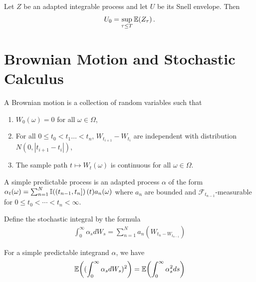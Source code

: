 \begin{thm}
  \label{sec:pric-hedg-cont-12}
  Let $Z$ be an adapted integrable process and let $U$ be its Snell
  envelope.  Then
  \begin{align}
    \label{eq:13}
    U_{0} = \sup_{\tau \leq T} \E{Z_{\tau}}.
  \end{align}
\end{thm}

\section{Brownian Motion and Stochastic Calculus}
\label{sec:brown-moti-stoch}

\begin{defn}
  \label{sec:brown-moti-stoch-1}
  A Brownian motion is a collection of random variables such that
  \begin{enumerate}
  \item $W_{0}(\omega) = 0$ for all $\omega \in \Omega$,
  \item For all $0 \leq t_{0} < t_{1} \dots < t_{n}$, $W_{t_{i+1}} -
    W_{t_{i}}$ are independent with distribution $N(0, |t_{i+1} - t_{i}|)$,
  \item The sample path $t \mapsto W_{t}(\omega)$ is continuous for
    all $\omega \in \Omega$.
  \end{enumerate}
\end{defn}

\begin{defn}
  \label{sec:brown-moti-stoch-2}
  A simple predictable process is an adapted process $\alpha$ of the
  form $\alpha_{t}(\omega) = \sum_{n=1}^{N} \I{(t_{n-1}, t_{n}]}(t)
  a_{n}(\omega)$ where $a_{n}$ are bounded and
  $\mathcal{F}_{t_{n-1}}$-measurable for $0 \leq t_{0} < \cdots < t_{n}
  < \infty$.

  Define the stochastic integral by the formula
  \begin{align}
    \label{eq:14}
    \int_{0}^{\infty} \alpha_{s} dW_{s} = \sum_{n=1}^{N}  a_{n}
    (W_{t_{n} - W_{t_{n-1}}})
  \end{align}
\end{defn}

\begin{thm}
  \label{sec:brown-moti-stoch-3}
  For a simple predictable integrand $\alpha$, we have
  \begin{align}
    \label{eq:15}
    \E{(\int_{0}^{\infty} \alpha_{s} dW_{s})^{2}} =
    \E{\int_{0}^{\infty} \alpha_{s}^{2} ds}
  \end{align}
\end{thm}

